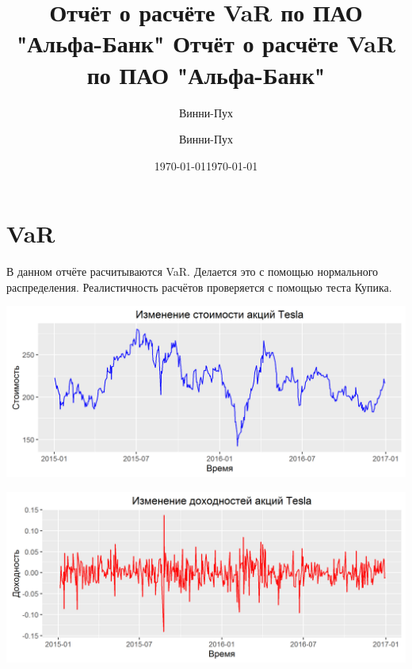 \documentclass [12pt, a4paper]{article}\usepackage[]{graphicx}\usepackage[]{color}
\title{Отчёт о расчёте VaR по ПАО "Альфа-Банк"}
\author{Винни-Пух}
\date{\today}
\makeatletter
\def\maxwidth{ %
  \ifdim\Gin@nat@width>\linewidth
    \linewidth
  \else
    \Gin@nat@width
  \fi
}
\newenvironment{knitrout}{}{} %
\makeatother
\begin{document}
\title{\vspace{10cm} Отчёт о расчёте VaR по ПАО "Альфа-Банк"}

\author{Винни-Пух}
\date{\today}

\maketitle

\thispagestyle{empty}

\newpage

\section{VaR}

 В данном отчёте расчитываются VaR. Делается это с помощью нормального распределения. Реалистичность расчётов проверяется с помощью теста Купика.
\vspace{3cm}


\begin{knitrout}
\color{fgcolor}

{\centering \includegraphics[width=\maxwidth]{figure/plot-1} 

}



\end{knitrout}
\vspace{2cm}
\begin{knitrout}
\color{fgcolor}

{\centering \includegraphics[width=\maxwidth]{figure/rate_of_return_plot-1} 

}



\end{knitrout}
\end{document}
